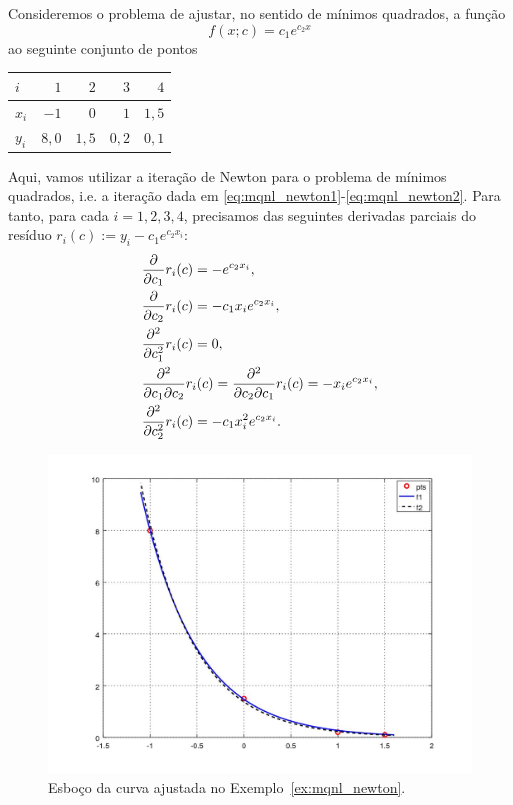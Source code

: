 \begin{ex}\label{ex:mqnl_newton}
  Consideremos o problema de ajustar, no sentido de mínimos quadrados, a função
  \begin{equation}
    f(x;c) = c_1e^{c_2x}
  \end{equation}
ao seguinte conjunto de pontos
\begin{center}
  \begin{tabular}{l|rrrr}
    $i$ & $1$ & $2$ & $3$ & $4$ \\\hline
    $x_i$ & $-1$ & $0$ & $1$ & $1,5$\\
    $y_i$ & $8,0$ & $1,5$ & $0,2$ & $0,1$\\\hline
  \end{tabular}
\end{center}

Aqui, vamos utilizar a iteração de Newton para o problema de mínimos quadrados, i.e. a iteração dada em \eqref{eq:mqnl_newton1}-\eqref{eq:mqnl_newton2}. Para tanto, para cada $i=1, 2, 3, 4$, precisamos das seguintes derivadas parciais do resíduo $r_i(c) := y_i - c_1e^{c_2x_i}$:
\begin{align}
  &\frac{\partial}{\partial c_1}r_i(c) = - e^{c_2x_i},\\
  &\frac{\partial}{\partial c_2}r_i(c) = - c_1x_ie^{c_2x_i},\\
  &\frac{\partial^2}{\partial c_1^2}r_i(c) = 0,\\
  &\frac{\partial^2}{\partial c_1\partial c_2}r_i(c) = \frac{\partial^2}{\partial c_2\partial c_1}r_i(c) = - x_ie^{c_2x_i},\\
  &\frac{\partial^2}{\partial c_2^2}r_i(c) = - c_1x_i^2e^{c_2x_i}.
\end{align}

\begin{figure}[h]
  \centering
  \includegraphics[width=\textwidth]{cap_ajuste/dados/ex_mqnl_N/ex_mqnl_N}
  \caption{Esboço da curva ajustada no Exemplo~\ref{ex:mqnl_newton}.}
  \label{fig:ex_mqnl_newton}
\end{figure}


\end{ex}
